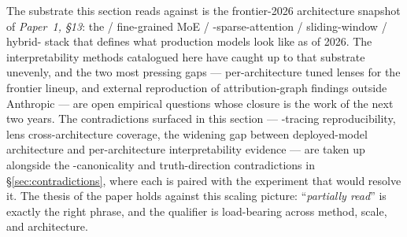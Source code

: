 The substrate this section reads against is the frontier-2026
architecture snapshot of \emph{Paper~1, §13}: the  / fine-grained
MoE / -sparse-attention / sliding-window / hybrid- stack that
defines what production models look like as of 2026. The
interpretability methods catalogued here have caught up to that
substrate unevenly, and the two most pressing gaps --- per-architecture
tuned lenses for the frontier lineup, and external reproduction of
attribution-graph findings outside Anthropic --- are open empirical
questions whose closure is the work of the next two years. The
contradictions surfaced in this section --- -tracing
reproducibility, lens cross-architecture coverage, the widening gap
between deployed-model architecture and per-architecture
interpretability evidence --- are taken up alongside the
-canonicality and truth-direction contradictions in
\S\ref{sec:contradictions}, where each is paired with the experiment
that would resolve it. The thesis of the paper holds against this
scaling picture: ``\emph{partially read}'' is exactly the right
phrase, and the qualifier is load-bearing across method, scale, and
architecture.
